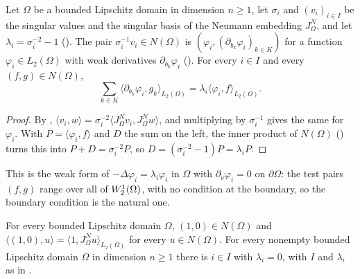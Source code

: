 \begin{theorem}
\label{thm:neumann-weak-eigen}
\leanok
{}
Let $\Omega$ be a bounded Lipschitz domain in dimension $n \geq 1$, let $\sigma_i$ and
$(v_i)_{i \in I}$ be the singular values and the singular basis of the Neumann embedding
$J^N_\Omega$, and let $\lambda_i = \sigma_i^{-2} - 1$ (). The pair
$\sigma_i^{-1} v_i \in N(\Omega)$ is $(\varphi_i, (\partial_{b_k} \varphi_i)_{k \in K})$ for a
function $\varphi_i \in L_2(\Omega)$ with weak derivatives $\partial_{b_k} \varphi_i$
(). For every $i \in I$ and every $(f, g) \in N(\Omega)$,
\[
  \sum_{k \in K} \langle \partial_{b_k} \varphi_i, g_k \rangle_{L_2(\Omega)}
    = \lambda_i \langle \varphi_i, f \rangle_{L_2(\Omega)} .
\]
\end{theorem}

\begin{proof}
\leanok
By , $\langle v_i, w \rangle = \sigma_i^{-2}
\langle J^N_\Omega v_i, J^N_\Omega w \rangle$, and multiplying by $\sigma_i^{-1}$ gives the same
for $\varphi_i$. With $P = \langle \varphi_i, f \rangle$ and $D$ the sum on the left, the inner
product of $N(\Omega)$ () turns this into $P + D = \sigma_i^{-2} P$, so
$D = (\sigma_i^{-2} - 1) P = \lambda_i P$.
\end{proof}

This is the weak form of $-\Delta \varphi_i = \lambda_i \varphi_i$ in $\Omega$ with
$\partial_\nu \varphi_i = 0$ on $\partial \Omega$: the test pairs $(f, g)$ range over all of
$W^{1}_{2}(\Omega)$, with no condition at the boundary, so the boundary condition is the
natural one.

\begin{proposition}
\label{prop:neumann-eigenvalue-zero}
\leanok
{}
For every bounded Lipschitz domain $\Omega$, $(1, 0) \in N(\Omega)$ and
$\langle (1, 0), u \rangle = \langle 1, J^N_\Omega u \rangle_{L_2(\Omega)}$ for every
$u \in N(\Omega)$. For every nonempty bounded Lipschitz domain $\Omega$ in dimension $n \geq 1$
there is $i \in I$ with $\lambda_i = 0$, with $I$ and $\lambda_i$ as in
.
\end{proposition}

